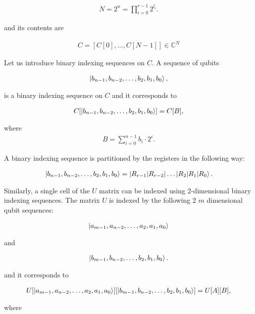 \begin{align*}
N = 2^n = \prod\limits_{i=0}^{r-1} 2^{l_i}.
\end{align*}

and its contents are

\begin{align*}
C = [C[0],\dots{},C[N-1]] \in{} \mathds{C}^N
\end{align*}

Let us introduce binary indexing sequences on $C$. A sequence of qubits

\begin{align*}
\ket{b_{n-1},b_{n-2},\dots{},b_2,b_1,b_0},
\end{align*}

is a binary indexing sequence on $C$ and it corresponds to

\begin{align*}
C[\ket{b_{n-1},b_{n-2},\dots{},b_2,b_1,b_0}] = C[B],
\end{align*}

where
\begin{align*}
B = \sum\limits_{i=0}^{n-1}b_i\cdot{}2^{i}.
\end{align*}

A binary indexing sequence is partitioned by the registers in the following way:

\begin{align*}
\ket{b_{n-1},b_{n-2},\dots{},b_2,b_1,b_0} = \ket{R_{r-1} | R_{r-2} | \dots{} | R_2 | R_1 | R_0}.
\end{align*}

Similarly, a single cell of the $U$ matrix can be indexed using 2-dimensional binary indexing sequences. The matrix $U$ is indexed by the following 2 $m$ dimensional qubit sequences:

\begin{align*}
\ket{a_{m-1},a_{n-2},\dots{},a_2,a_1,a_0}
\end{align*}

and

\begin{align*}
\ket{b_{m-1},b_{n-2},\dots{},b_2,b_1,b_0}.
\end{align*}

and it corresponds to

\begin{align*}
U[\ket{a_{m-1},a_{n-2},\dots{},a_2,a_1,a_0}][\ket{b_{m-1},b_{n-2},\dots{},b_2,b_1,b_0}] = U[A][B],
\end{align*}

where

